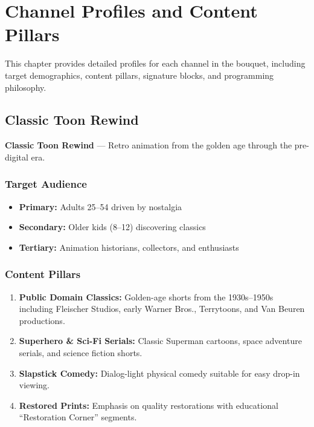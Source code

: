 \documentclass[12pt,letterpaper,twoside]{report}
\begin{document}
\chapter{Channel Profiles and Content Pillars}
\label{ch:profiles}

This chapter provides detailed profiles for each channel in the bouquet, including target demographics, content pillars, signature blocks, and programming philosophy.

\section{Classic Toon Rewind}
\label{sec:classic-toon}

\begin{channelbox}[classictoon]
\textbf{Classic Toon Rewind} --- Retro animation from the golden age through the pre-digital era.
\end{channelbox}

\subsection{Target Audience}

\begin{itemize}[leftmargin=1.5cm]
    \item \textbf{Primary:} Adults 25--54 driven by nostalgia
    \item \textbf{Secondary:} Older kids (8--12) discovering classics
    \item \textbf{Tertiary:} Animation historians, collectors, and enthusiasts
\end{itemize}

\subsection{Content Pillars}

\begin{enumerate}[leftmargin=2cm]
    \item \textbf{Public Domain Classics:} Golden-age shorts from the 1930s--1950s including Fleischer Studios, early Warner Bros., Terrytoons, and Van Beuren productions.
    \item \textbf{Superhero \& Sci-Fi Serials:} Classic Superman cartoons, space adventure serials, and science fiction shorts.
    \item \textbf{Slapstick Comedy:} Dialog-light physical comedy suitable for easy drop-in viewing.
    \item \textbf{Restored Prints:} Emphasis on quality restorations with educational ``Restoration Corner'' segments.
\end{enumerate}
\end{document}
